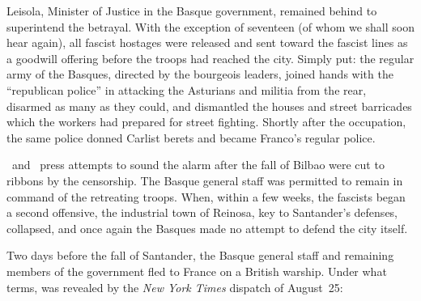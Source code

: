 Leisola, Minister of Justice in the Basque government, remained behind to superintend the betrayal. With the exception of seventeen (of whom we shall soon hear again), all fascist hostages were released and sent toward the fascist lines as a goodwill offering before the troops had reached the city. Simply put: the regular army of the Basques, directed by the bourgeois leaders, joined hands with the ``republican police'' in attacking the Asturians and militia from the rear, disarmed as many as they could, and dismantled the houses and street barricades which the workers had prepared for street fighting. Shortly after the occupation, the same police donned Carlist berets and became Franco’s regular police.

\CNT\ and \UGT\ press attempts to sound the alarm after the fall of Bilbao were cut to ribbons by the censorship. The Basque general staff was permitted to remain in command of the retreating troops. When, within a few weeks, the fascists began a second offensive, the industrial town of Reinosa, key to Santander’s defenses, collapsed, and once again the Basques made no attempt to defend the city itself.

Two days before the fall of Santander, the Basque general staff and remaining members of the government fled to France on a British warship. Under what terms, was revealed by the \emph{New York Times} dispatch of August~25:
